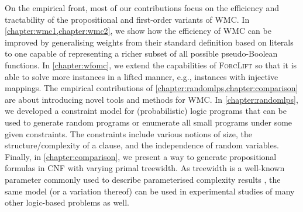 On the empirical front, most of our contributions focus on the efficiency and
tractability of the propositional and first-order variants of WMC\@. In
\cref{chapter:wmc1,chapter:wmc2}, we show how the efficiency of WMC can be
improved by generalising weights from their standard definition based on
literals to one capable of representing a richer subset of all possible
pseudo-Boolean functions. In \cref{chapter:wfomc}, we extend the capabilities of
\textsc{ForcLift} \citep{DBLP:conf/ijcai/BroeckTMDR11} so that it is able to
solve more instances in a lifted manner, e.g., instances with injective
mappings. The empirical contributions of
\cref{chapter:randomlps,chapter:comparison} are about introducing novel tools
and methods for WMC\@. In \cref{chapter:randomlps}, we developed a constraint
model for (probabilistic) logic programs that can be used to generate random
programs or enumerate all small programs under some given constraints. The
constraints include various notions of size, the structure/complexity of a
clause, and the independence of random variables. Finally, in
\cref{chapter:comparison}, we present a way to generate propositional formulas
in CNF with varying primal treewidth. As treewidth is a well-known parameter
commonly used to describe parameterised complexity results
\citep{DBLP:series/txcs/DowneyF13}, the same model (or a variation thereof) can
be used in experimental studies of many other logic-based problems as well.


